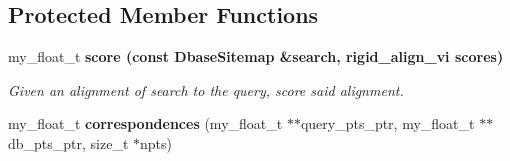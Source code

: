 \subsection*{Protected Member Functions}
\begin{CompactItemize}
\item 
my\_\-float\_\-t \bf{score} (const \bf{Dbase\-Sitemap} \&search, rigid\_\-align\_\-vi scores)
\begin{CompactList}\small\item\em Given an alignment of search to the query, score said alignment. \item\end{CompactList}\item 
my\_\-float\_\-t \textbf{correspondences} (my\_\-float\_\-t $\ast$$\ast$query\_\-pts\_\-ptr, my\_\-float\_\-t $\ast$$\ast$db\_\-pts\_\-ptr, size\_\-t $\ast$npts)\label{classSimSite3D_1_1TestScoring_1bce69b267b72ae43cd980caa7fcfd0e}

\end{CompactItemize}

